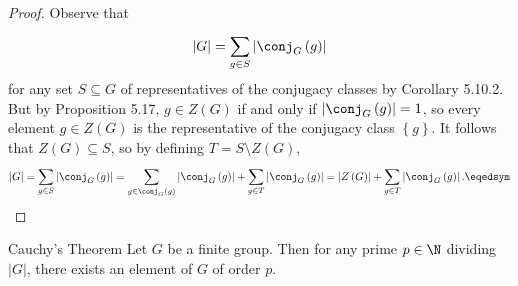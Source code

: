 \documentclass[pmath347]{subfiles}
\begin{document}
    \begin{proof}
        Observe that
        \begin{equation*}
            \left| G  \right| = \sum^{}_{g\in S} \left| \conj_G\left( g \right)  \right| 
        \end{equation*}
        for any set $S\subseteq G$ of representatives of the conjugacy classes by Corollary 5.10.2. But by Proposition 5.17, $g\in Z\left( G \right)$ if and only if $\left| \conj_G\left( g \right)  \right| = 1$, so every element $g\in Z\left( G \right)$ is the representative of the conjugacy class $\left\lbrace g \right\rbrace$. It follows that $Z\left( G \right) \subseteq S$, so by defining $T=S\setminus Z\left( G \right)$,
        \begin{equation*}
            \left| G \right| = \sum^{}_{g\in S} \left| \conj_G\left( g \right)  \right| = \sum^{}_{g\in\conj_G\left( g \right) } \left| \conj_G\left( g \right)  \right| + \sum^{}_{g\in T} \left| \conj_G\left( g \right)  \right| = \left| Z\left( G \right)  \right| + \sum^{}_{g\in T} \left| \conj_G\left( g \right)  \right| . \eqedsym
        \end{equation*}
    \end{proof}

    \begin{theorem}{Cauchy's Theorem}
        Let $G$ be a finite group. Then for any prime $p\in\N$ dividing $\left| G \right|$, there exists an element of $G$ of order $p$.
    \end{theorem}
\end{document}
